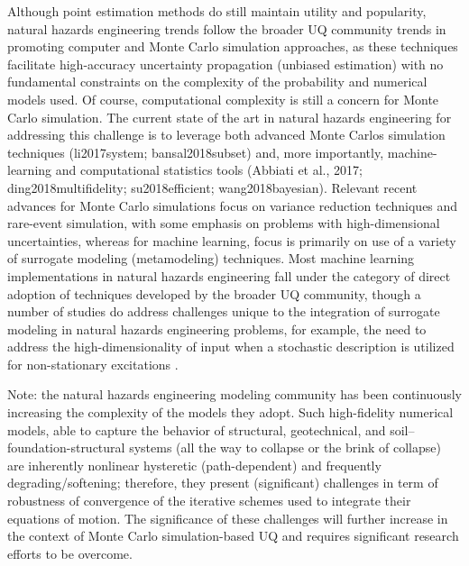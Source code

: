 Although point estimation methods do still maintain utility and popularity, natural hazards engineering trends follow the broader UQ community trends in promoting computer and Monte Carlo simulation approaches, as these techniques facilitate high-accuracy uncertainty propagation (unbiased estimation) with no fundamental constraints on the complexity of the probability and numerical models used. Of course, computational complexity is still a concern for Monte Carlo simulation. The current state of the art in natural hazards engineering for addressing this challenge is to leverage both advanced Monte Carlos simulation techniques (li2017system; bansal2018subset) and, more importantly, machine-learning and computational statistics tools (Abbiati et al., 2017; ding2018multifidelity; su2018efficient; wang2018bayesian). Relevant recent advances for Monte Carlo simulations focus on variance reduction techniques and rare-event simulation, with some emphasis on problems with high-dimensional uncertainties, whereas for machine learning, focus is primarily on use of a variety of surrogate modeling (metamodeling) techniques. Most machine learning implementations in natural hazards engineering fall under the category of direct adoption of techniques developed by the broader UQ community, though a number of studies do address challenges unique to the integration of surrogate modeling in natural hazards engineering problems, for example, the need to address the high-dimensionality of input when a stochastic description is utilized for non-stationary excitations \citep{gidaris2015kriging}.

Note: the natural hazards engineering modeling community has been continuously increasing the complexity of the models they adopt. Such high-fidelity numerical models, able to capture the behavior of structural, geotechnical, and soil–foundation-structural systems (all the way to collapse or the brink of collapse) are inherently nonlinear hysteretic (path-dependent) and frequently degrading/softening; therefore, they present (significant) challenges in term of robustness of convergence of the iterative schemes used to integrate their equations of motion. The significance of these challenges will further increase in the context of Monte Carlo simulation-based UQ and requires significant research efforts to be overcome.

